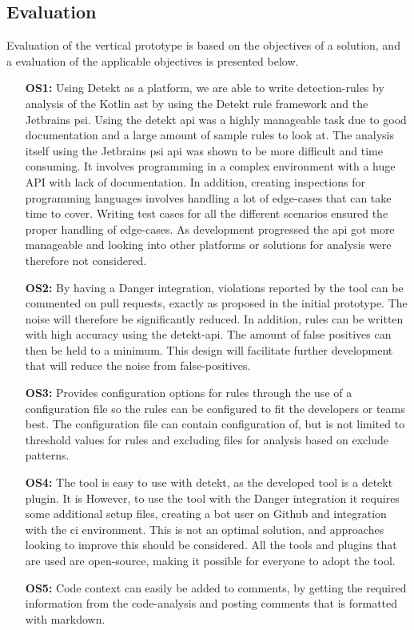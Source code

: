 \documentclass{report}
\begin{document}
\subsection*{Evaluation}
Evaluation of the vertical prototype is based on the objectives of a solution, and a evaluation of the applicable objectives is presented below.
\begin{itemize}
    \item [\textbf{OS1:}] Using Detekt as a platform, we are able to write detection-rules by analysis of the Kotlin \gls{ast} by using the Detekt rule framework and the  Jetbrains \gls{psi}. Using the detekt \gls{api} was a highly manageable task due to good documentation and a large amount of sample rules to look at. The analysis itself using the Jetbrains \gls{psi} \gls{api} was shown to be more difficult and time consuming. It involves programming in a complex environment with a huge API with lack of documentation. In addition, creating inspections for programming languages involves handling a lot of edge-cases that can take time to cover. Writing test cases for all the different scenarios ensured the proper handling of edge-cases. As development progressed the \gls{api} got more manageable and looking into other platforms or solutions for analysis were therefore not considered. \label{vertical-os1}
    
    \item [\textbf{OS2:}] By having a Danger integration, violations reported by the tool can be commented on pull requests, exactly as proposed in the initial prototype. The noise will therefore be significantly reduced. In addition, rules can be written with high accuracy using the detekt-api.  The amount of false positives can then be held to a minimum. This design will facilitate further development that will reduce the noise from false-positives. 
    
    \item [\textbf{OS3:}] Provides configuration options for rules through the use of a configuration file so the rules can be configured to fit the developers or teams best. The configuration file can contain configuration of, but is not limited to threshold values for rules and excluding files for analysis based on exclude patterns. \label{vertical-os3}
    
    \item [\textbf{OS4:}] The tool is easy to use with detekt, as the developed tool is a detekt plugin. It is However, to use the tool with the Danger integration it requires some additional setup files, creating a bot user on Github and integration with the \gls{ci} environment. This is not an optimal solution, and approaches looking to improve this should be considered. All the tools and plugins that are used are open-source, making it possible for everyone to adopt the tool. \label{vertical-os4}
    
    \item [\textbf{OS5:}] Code context can easily be added to comments, by getting the required information from the code-analysis and posting comments that is formatted with markdown. \label{vertical-os5}

\end{itemize}
\end{document}

